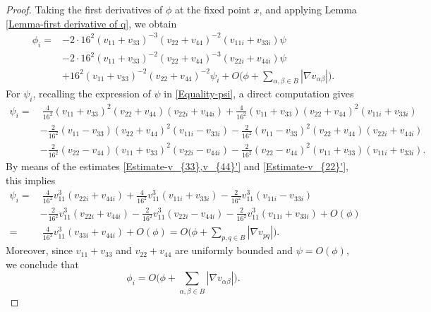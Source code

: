 \documentclass[11pt]{amsart}
\numberwithin{theorem}{section}
\numberwithin{equation}{section}
\begin{document}
\begin{proof}
Taking the first derivatives of $\phi$ at the fixed point $x$, and applying Lemma \ref{Lemma-first derivative of q}, we obtain
\begin{align*}
\phi_i
=&-2\cdot16^2(v_{11}+v_{33})^{-3}(v_{22}+v_{44})^{-2}(v_{11i}+v_{33i})\psi\\
&-2\cdot16^2(v_{11}+v_{33})^{-2}(v_{22}+v_{44})^{-3}(v_{22i}+v_{44i})\psi\\
&+16^2(v_{11}+v_{33})^{-2}(v_{22}+v_{44})^{-2}\psi_i+O\bigg(\phi+\sum_{\alpha,\beta\in B}|\nabla v_{\alpha\beta}|\bigg).
\end{align*}
For $\psi_i$, recalling the expression of $\psi$ in \eqref{Equality-psi}, a direct computation gives
\begin{align*}
\psi_i
=&~\frac{4}{16^2}(v_{11}+v_{33})^2(v_{22}+v_{44})(v_{22i}+v_{44i})+\frac{4}{16^2}(v_{11}+v_{33})(v_{22}+v_{44})^2(v_{11i}+v_{33i})\\
&-\frac{2}{16^2}(v_{11}-v_{33})(v_{22}+v_{44})^2(v_{11i}-v_{33i})-\frac{2}{16^2}(v_{11}-v_{33})^2(v_{22}+v_{44})(v_{22i}+v_{44i})\\
&-\frac{2}{16^2}(v_{22}-v_{44})(v_{11}+v_{33})^2(v_{22i}-v_{44i})-\frac{2}{16^2}(v_{22}-v_{44})^2(v_{11}+v_{33})(v_{11i}+v_{33i}).
\end{align*}
By means of the estimates \eqref{Estimate-v_{33},v_{44}'} and \eqref{Estimate-v_{22}'}, this implies
\begin{equation}\label{Equality-psi_i}
\begin{aligned}
\psi_i
=&~\frac{4}{16^2}v_{11}^3(v_{22i}+v_{44i})+\frac{4}{16^2}v_{11}^3(v_{11i}+v_{33i})-\frac{2}{16^2}v_{11}^3(v_{11i}-v_{33i})\\
&-\frac{2}{16^2}v_{11}^3(v_{22i}+v_{44i})-\frac{2}{16^2}v_{11}^3(v_{22i}-v_{44i})-\frac{2}{16^2}v_{11}^3(v_{11i}+v_{33i})+O(\phi)\\
=&~\frac{4}{16^2}v_{11}^3(v_{33i}+v_{44i})+O(\phi)=O\bigg(\phi+\sum_{p,q\in B}|\nabla v_{pq}|\bigg).
\end{aligned}
\end{equation}
Moreover, since $v_{11}+v_{33}$ and $v_{22}+v_{44}$ are uniformly bounded and $\psi=O(\phi)$, we conclude that
\begin{equation}\label{Equality-phi_i-2}
\phi_i=O\bigg(\phi+\sum_{\alpha,\beta\in B}|\nabla v_{\alpha\beta}|\bigg).
\end{equation}


\end{proof}
\end{document}
